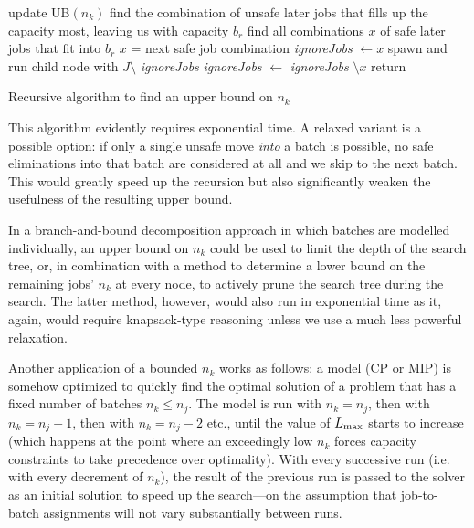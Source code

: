 \documentclass[13pt, letterpaper, oneside]{book}
\begin{document}
\begin{algorithm}[h]
\fontsize{9pt}{11.5pt}\selectfont
\begin{algorithmic}
 
  \State update UB$(n_k)$
\EndIf
\State find the combination of unsafe later jobs that fills up the capacity
most, leaving us with capacity $b_r$ 
\State find all combinations $x$ of safe later jobs that fit into $b_r$
\Repeat
  \State $x$ = next safe job combination
  \State \textit{ignoreJobs} $\gets x$ 
  \State spawn and run child node with $J \setminus$ \textit{ignoreJobs}
  \State \textit{ignoreJobs} $\gets$ \textit{ignoreJobs} $\setminus x$
\State return
\end{algorithmic}
\caption{Recursive algorithm to find an upper bound on $n_k$}
\label{alg:bounding_nk}
\end{algorithm}

This algorithm evidently requires exponential time. A relaxed variant is a
possible option: if only a single unsafe move \textit{into} a batch is possible,
no safe eliminations into that batch are considered at all and we skip to the
next batch. This would greatly speed up the recursion but also significantly
weaken the usefulness of the resulting upper bound.

In a branch-and-bound decomposition approach in which batches are modelled
individually, an upper bound on $n_k$ could be used to limit the depth of the
search tree, or, in combination with a method to determine a lower bound on the
remaining jobs' $n_k$ at every node, to actively prune the search tree during
the search. The latter method, however, would also run in exponential time as
it, again, would require knapsack-type reasoning unless we use a much less powerful
relaxation.

Another application of a bounded $n_k$ works as follows: a model (CP or MIP) is
somehow optimized to quickly find the optimal solution of a problem that has a
fixed number of batches $n_k \leq n_j$. The model is run with $n_k = n_j$, then
with $n_k = n_j - 1$, then with $n_k = n_j - 2$ etc., until the value of $L_{\text{max}}$
starts to increase (which happens at the point where an exceedingly low $n_k$
forces capacity constraints to take precedence over optimality). With every
successive run (i.e. with every decrement of $n_k$), the result of the previous
run is passed to the solver as an initial solution to speed up the search---on
the assumption that job-to-batch assignments will not vary substantially between
runs.
\end{document}
